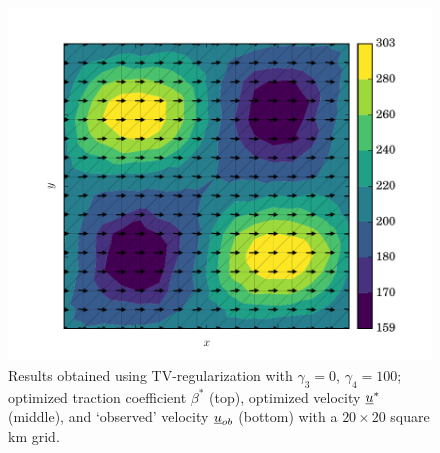 \begin{figure}
    \includegraphics[width=0.9\linewidth]{images/data_assimilation/ISMIP_HOM_C/TV/U_ob.pdf}
  \caption[TV-regularized inverse ISMIP-HOM results]{Results obtained using TV-regularization with $\gamma_3=0$, $\gamma_4=100$; optimized traction coefficient $\beta^*$ (top), optimized velocity $\underline{u}^*$ (middle), and `observed' velocity $\underline{u}_{ob}$ (bottom) with a $20 \times 20$ square km grid.}
  \label{inverse_ismip_opt_tv}
\end{figure}

